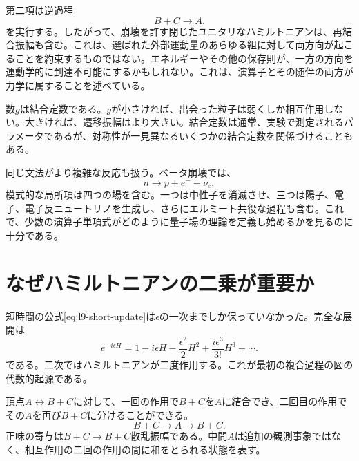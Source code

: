 第二項は逆過程
\begin{equation}
B+C\longrightarrow A.
\end{equation}
を実行する。したがって、崩壊を許す閉じたユニタリなハミルトニアンは、再結合振幅も含む。これは、選ばれた外部運動量のあらゆる組に対して両方向が起こることを約束するものではない。エネルギーやその他の保存則が、一方の方向を運動学的に到達不可能にするかもしれない。これは、演算子とその随伴の両方が力学に属することを述べている。

\begin{classroomqa}
\end{classroomqa}

数\(g\)は結合定数である。\(g\)が小さければ、出会った粒子は弱くしか相互作用しない。大きければ、遷移振幅はより大きい。結合定数は通常、実験で測定されるパラメータであるが、対称性が一見異なるいくつかの結合定数を関係づけることもある。

同じ文法がより複雑な反応も扱う。ベータ崩壊では、
\begin{equation}
n\longrightarrow p+e^-+\bar\nu_e,
\end{equation}
模式的な局所項は四つの場を含む。一つは中性子を消滅させ、三つは陽子、電子、電子反ニュートリノを生成し、さらにエルミート共役な過程も含む。これで、少数の演算子単項式がどのように量子場の理論を定義し始めるかを見るのに十分である。

\section{なぜハミルトニアンの二乗が重要か}

短時間の公式\eqref{eq:l9-short-update}は\(\epsilon\)の一次までしか保っていなかった。完全な展開は
\begin{equation}
e^{-i\epsilon H}
=1-i\epsilon H-\frac{\epsilon^2}{2}H^2
+\frac{i\epsilon^3}{3!}H^3+\cdots.
\label{eq:l9-exponential}
\end{equation}
である。二次ではハミルトニアンが二度作用する。これが最初の複合過程の図の代数的起源である。

頂点\(A\leftrightarrow B+C\)に対して、一回の作用で\(B+C\)を\(A\)に結合でき、二回目の作用でその\(A\)を再び\(B+C\)に分けることができる。
\begin{equation}
B+C\longrightarrow A\longrightarrow B+C.
\label{eq:l9-bc-scattering}
\end{equation}
正味の寄与は\(B+C\to B+C\)散乱振幅である。中間\(A\)は追加の観測事象ではなく、相互作用の二回の作用の間に和をとられる状態を表す。

